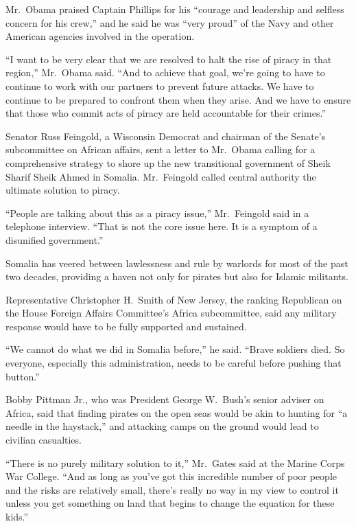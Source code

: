 \documentclass[12pt,a4paper,onecolumn]{article}
\begin{document}
Mr.~Obama praised Captain Phillips for his ``courage and leadership and selfless concern for his
crew,'' and he said he was ``very proud'' of the Navy and other American agencies involved in the
operation.

``I want to be very clear that we are resolved to halt the rise of piracy in that region,''
Mr.~Obama said. ``And to achieve that goal, we're going to have to continue to work with our
partners to prevent future attacks. We have to continue to be prepared to confront them when they
arise. And we have to ensure that those who commit acts of piracy are held accountable for their
crimes.''

Senator Russ Feingold, a Wisconsin Democrat and chairman of the Senate's subcommittee on African
affairs, sent a letter to Mr.~Obama calling for a comprehensive strategy to shore up the new
transitional government of Sheik Sharif Sheik Ahmed in Somalia. Mr.~Feingold called central
authority the ultimate solution to piracy.

``People are talking about this as a piracy issue,'' Mr.~Feingold said in a telephone interview.
``That is not the core issue here. It is a symptom of a disunified government.''

Somalia has veered between lawlessness and rule by warlords for most of the past two decades,
providing a haven not only for pirates but also for Islamic militants.

Representative Christopher H.~Smith of New Jersey, the ranking Republican on the House Foreign
Affairs Committee's Africa subcommittee, said any military response would have to be fully supported
and sustained.

``We cannot do what we did in Somalia before,'' he said. ``Brave soldiers died. So everyone,
especially this administration, needs to be careful before pushing that button.''

Bobby Pittman Jr., who was President George W.~Bush's senior adviser on Africa, said that finding
pirates on the open seas would be akin to hunting for ``a needle in the haystack,'' and attacking
camps on the ground would lead to civilian casualties.

``There is no purely military solution to it,'' Mr.~Gates said at the Marine Corps War College.
``And as long as you've got this incredible number of poor people and the risks are relatively
small, there's really no way in my view to control it unless you get something on land that begins
to change the equation for these kids.''
\end{document}

